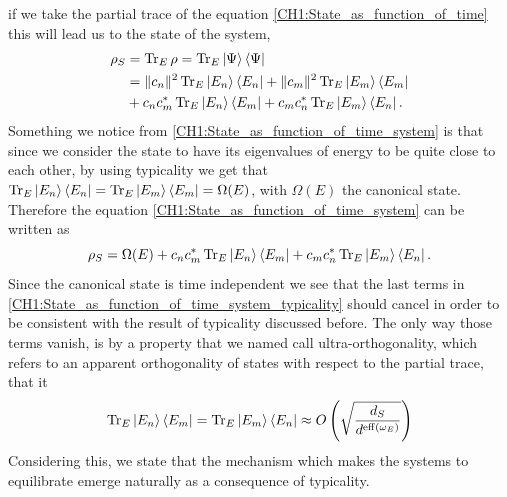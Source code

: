 if we take the partial trace of the equation \eqref{CH1:State_as_function_of_time} this will lead us to the state of the system,
\begin{equation}
\begin{aligned}
\rho_S &= \operatorname{Tr}_E \rho = \operatorname{Tr}_E  \mathinner{|{\Psi}\rangle}\mathinner{\langle{\Psi}|}\\
&= \|c_n\|^2\operatorname{Tr}_E  \mathinner{|{E_n}\rangle}\mathinner{\langle{E_n}|} +  \|c_m\|^2 \operatorname{Tr}_E \mathinner{|{E_m}\rangle}\mathinner{\langle{E_m}|} \\
& + c_n c^{*}_m  \operatorname{Tr}_E \mathinner{|{E_n}\rangle}\mathinner{\langle{E_m}|} + c_m c^{*}_n \operatorname{Tr}_E \mathinner{|{E_m}\rangle}\mathinner{\langle{E_n}|}.
\end{aligned}
\label{CH1:State_as_function_of_time_system}
\end{equation}
Something we notice from \eqref{CH1:State_as_function_of_time_system} is that since we consider the state to have its eigenvalues of energy to be quite close to each other, by using typicality we get that $\operatorname{Tr}_E \mathinner{|{E_n}\rangle}\mathinner{\langle{E_n}|} =\operatorname{Tr}_E \mathinner{|{E_m}\rangle}\mathinner{\langle{E_m}|} = \Omega(E)$, with $\Omega(E)$ the canonical state. Therefore the equation \eqref{CH1:State_as_function_of_time_system} can be written as
\begin{equation}
\rho_S= \Omega(E) + c_n c^{*}_m  \operatorname{Tr}_E \mathinner{|{E_n}\rangle}\mathinner{\langle{E_m}|} + c_m c^{*}_n \operatorname{Tr}_E \mathinner{|{E_m}\rangle}\mathinner{\langle{E_n}|}.
\label{CH1:State_as_function_of_time_system_typicality}
\end{equation}
Since the canonical state is time independent we see that the last terms in  \eqref{CH1:State_as_function_of_time_system_typicality} should cancel in order to be consistent with the result of typicality discussed before. The only way those terms vanish, is by a property that we named call ultra-orthogonality, which refers to an apparent orthogonality of states with respect to the partial trace, that it
\begin{equation}
\operatorname{Tr}_E \mathinner{|{E_n}\rangle}\mathinner{\langle{E_m}|} = \operatorname{Tr}_E \mathinner{|{E_m}\rangle}\mathinner{\langle{E_n}|} \approx O\left(\sqrt{\frac{d_S}{d^{\operatorname{eff}(\omega_E)}}}\right)
\end{equation}
Considering this, we state that the mechanism which makes the systems to equilibrate emerge naturally as a consequence of typicality.
\newline
